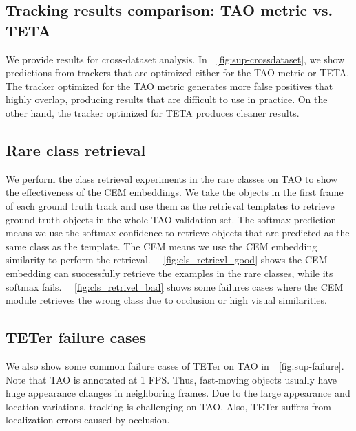 \documentclass[runningheads]{llncs}
\begin{document}
\subsection{Tracking results comparison: TAO metric vs. TETA }
We provide results for cross-dataset analysis.
In~\figurename~\ref{fig:sup-crossdataset}, we show predictions from trackers that are optimized either for the TAO metric or TETA. The tracker optimized for the TAO metric generates more false positives that highly overlap, producing results that are difficult to use in practice. On the other hand, the tracker optimized for TETA produces cleaner results.

\subsection{Rare class retrieval}

We perform the class retrieval experiments in the rare classes on TAO to show the effectiveness of the CEM embeddings. We take the objects in the first frame of each ground truth track and use them as the retrieval templates to retrieve ground truth objects in the whole TAO validation set. The softmax prediction means we use the softmax confidence to retrieve objects that are predicted as the same class as the template. The CEM means we use the CEM embedding similarity to perform the retrieval. ~\figurename~\ref{fig:cls_retrievl_good} shows the CEM embedding can successfully retrieve the examples in the rare classes, while its softmax fails. 
~\figurename~\ref{fig:cls_retrivel_bad} shows some failures cases where the CEM module retrieves the wrong class due to occlusion or high visual similarities. 


\subsection{TETer failure cases}
We also show some common failure cases of TETer on TAO in~\figurename~\ref{fig:sup-failure}. Note that TAO is annotated at 1 FPS. Thus, fast-moving objects usually have huge appearance changes in neighboring frames.
Due to the large appearance and location variations, tracking is challenging on TAO. Also, TETer suffers from localization errors caused by occlusion.
\end{document}
